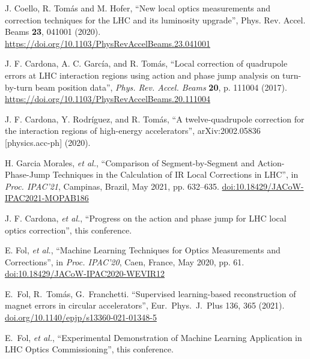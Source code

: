 \documentclass{cernatsnote}
\begin{document}
\begin{thebibliography}{99}

J. Coello, R. Tom\'as and M. Hofer, ``New local optics measurements and correction techniques for the LHC and its luminosity upgrade'', Phys. Rev. Accel. Beams {\bf 23}, 041001 (2020).
\url{https://doi.org/10.1103/PhysRevAccelBeams.23.041001}

 J. F.  Cardona, A. C. Garc\'ia, and R. Tom\'as, ``Local correction of quadrupole errors at LHC interaction regions using action and phase jump analysis on turn-by-turn beam position data'', {\it Phys. Rev. Accel. Beams} {\bf 20}, p. 111004 (2017).
\url{https://doi.org/10.1103/PhysRevAccelBeams.20.111004}

 J. F.  Cardona, Y. Rodr\'iguez, and R. Tom\'as, ``A twelve-quadrupole correction for the interaction regions of high-energy accelerators'',  arXiv:2002.05836 [physics.acc-ph] (2020).

   H. Garcia Morales, {\it et al.},
   \textquotedblleft{Comparison of Segment-by-Segment and Action-Phase-Jump Techniques in the Calculation of IR Local Corrections in LHC}\textquotedblright,
   in \emph{Proc. IPAC’21}, Campinas, Brazil, May 2021, pp. 632--635.
   \url{doi:10.18429/JACoW-IPAC2021-MOPAB186}  

 J. F. Cardona, {\it et al.}, ``Progress on the action and phase jump for LHC local optics correction'', this conference.


  E. Fol, {\it et al.},
   \textquotedblleft{Machine Learning Techniques for Optics Measurements and Corrections}\textquotedblright,
   in \emph{Proc. IPAC’20}, Caen, France, May 2020, pp. 61.
   \url{doi:10.18429/JACoW-IPAC2020-WEVIR12} 

 E.~Fol, R.~Tom\'as,  G.~Franchetti. ``Supervised learning-based reconstruction of magnet errors in circular accelerators'', Eur.~Phys.~J.~Plus 136, 365 (2021). \url{doi.org/10.1140/epjp/s13360-021-01348-5}

 E.~Fol, {\it et al.}, ``Experimental Demonstration of Machine Learning Application in LHC Optics Commissioning'', this conference.



\end{thebibliography}
\end{document}

